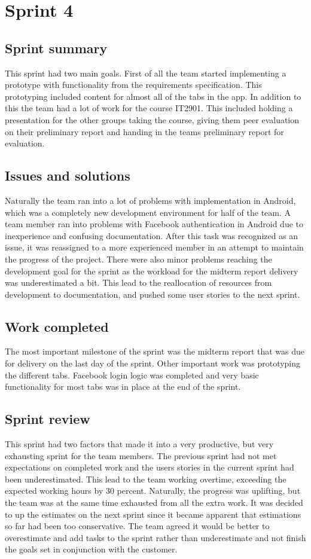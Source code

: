 \section{Sprint 4}
\subsection{Sprint summary}
This sprint had two main goals. First of all the team started implementing a prototype with functionality from the requirements specification. This prototyping included content for almost all of the tabs in the app. In addition to this the team had a lot of work for the course IT2901. This included holding a presentation for the other groups taking the course, giving them peer evaluation on their preliminary report and handing in the teams preliminary report for evaluation.



\subsection{Issues and solutions}
Naturally the team ran into a lot of problems with implementation in Android, which was a completely new development environment for half of the team. A team member ran into problems with Facebook authentication in Android due to inexperience and confusing documentation. After this task was recognized as an issue, it was reassigned to a more experienced member in an attempt to maintain the progress of the project. There were also minor problems reaching the development goal for the sprint as the workload for the midterm report delivery was underestimated a bit. This lead to the reallocation of resources from development to documentation, and pushed some user stories to the next sprint.

\subsection{Work completed}
The most important milestone of the sprint was the midterm report that was due for delivery on the last day of the sprint. Other important work was prototyping the different tabs. Facebook login logic was completed and very basic functionality for most tabs was in place at the end of the sprint.

\subsection{Sprint review}
This sprint had two factors that made it into a very productive, but very exhausting sprint for the team members. The previous sprint had not met expectations on completed work and the users stories in the current sprint had been underestimated. This lead to the team working overtime, exceeding the expected working hours by 30 percent. Naturally, the progress was uplifting, but the team was at the same time exhausted from all the extra work. It was decided to up the estimates on the next sprint since it became apparent that estimations so far had been too conservative. The team agreed it would be better to overestimate and add tasks to the sprint rather than underestimate and not finish the goals set in conjunction with the customer.